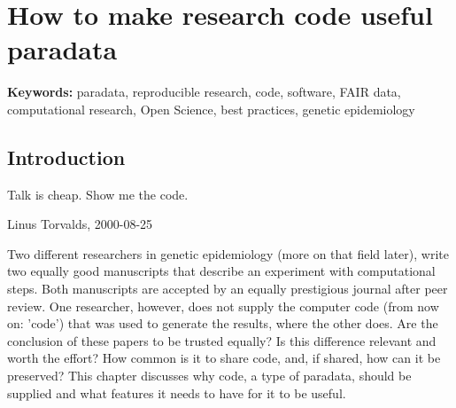 \chapter{How to make research code useful paradata}


{\bf Keywords:} paradata, reproducible research, code, software,
FAIR data, computational research, Open Science, best practices,
genetic epidemiology

\section{Introduction}

\epigraph{
  Talk is cheap. Show me the code.
}{
  Linus Torvalds, 2000-08-25
}


Two different researchers in genetic epidemiology (more on that field later), 
write two equally good manuscripts
that describe an experiment with computational steps.
Both manuscripts are accepted by an equally prestigious journal after peer review. 
One researcher, however, does not supply the
computer code (from now on: 'code') that was used to generate the results,
where the other does.
Are the conclusion of these papers to be trusted equally?
Is this difference relevant and worth the effort?
How common is it to share code, and, if shared, how can it be preserved?
This chapter discusses why code, a type of paradata, 
should be supplied and what features it needs to have
for it to be useful.


